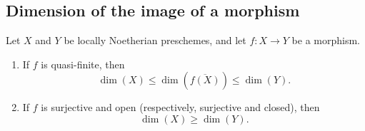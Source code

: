 \subsection{Dimension of the image of a morphism}
\label{subsection:IV.5.4}

\begin{proposition}[5.4.1]
\label{IV.5.4.1}
Let $X$ and $Y$ be locally Noetherian preschemes, and let
$f:X\to Y$ be a morphism.
\begin{enumerate}[{\rm(i)}]
\item
{}
\label{IV.5.4.1.i}
If $f$ is quasi-finite, then
\[
\dim(X)\leq\dim(\overline{f(X)})\leq\dim(Y).
\]
\item
{}
\label{IV.5.4.1.ii}
If $f$ is surjective and open (respectively, surjective and closed),
then
\[
\dim(X)\geq\dim(Y).
\]
\end{enumerate}
\end{proposition}

